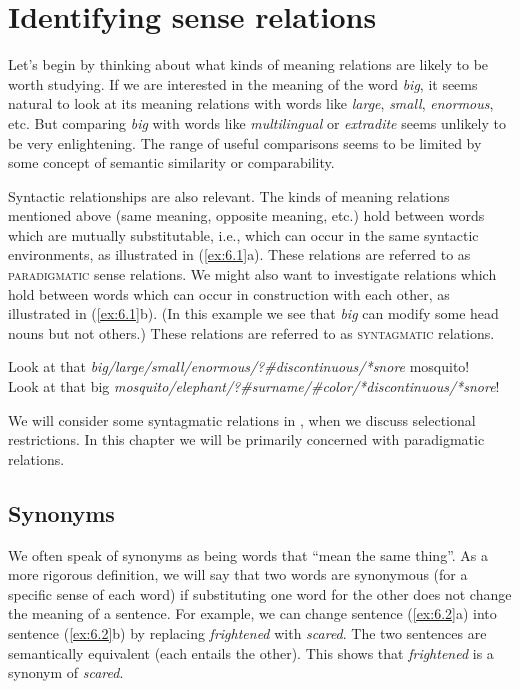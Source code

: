 \section{Identifying sense relations}\label{sec:} %

Let’s begin by thinking about what kinds of meaning relations are likely to be worth studying. If we are interested in the meaning of the word \textit{big}, it seems natural to look at its meaning relations with words like \textit{large}, \textit{small}, \textit{enormous}, etc. But comparing \textit{big} with words like \textit{multilingual} or \textit{extradite} seems unlikely to be very enlightening. The range of useful comparisons seems to be limited by some concept of semantic similarity or comparability.



Syntactic relationships are also relevant. The kinds of meaning relations mentioned above (same meaning, opposite meaning, etc.) hold between words which are mutually substitutable, i.e., which can occur in the same syntactic environments, as illustrated in (\ref{ex:6.1}a). These relations are referred to as \textsc{paradigmatic} sense relations. We might also want to investigate relations which hold between words which can occur in construction with each other, as illustrated in (\ref{ex:6.1}b). (In this example we see that \textit{big} can modify some head nouns but not others.) These relations are referred to as \textsc{syntagmatic} relations.


\ea \label{ex:6.1}
\ea Look at that \textit{big/large/small/enormous/?\#discontinuous/*snore} mosquito!\\
\ex Look at that big \textit{mosquito/elephant/?\#surname/\#color/*discontinuous/*snore}!
                       \z
\z


We will consider some syntagmatic relations in , when we discuss selectional restrictions. In this chapter we will be primarily concerned with paradigmatic relations.


\subsection{Synonyms}\label{sec:} %

We often speak of synonyms as being words that “mean the same thing”. As a more rigorous definition, we will say that two words are synonymous (for a specific sense of each word) if substituting one word for the other does not change the meaning of a sentence. For example, we can change sentence (\ref{ex:6.2}a) into sentence (\ref{ex:6.2}b) by replacing \textit{frightened} with \textit{scared}. The two sentences are semantically equivalent (each entails the other). This shows that \textit{frightened} is a synonym of \textit{scared}.


